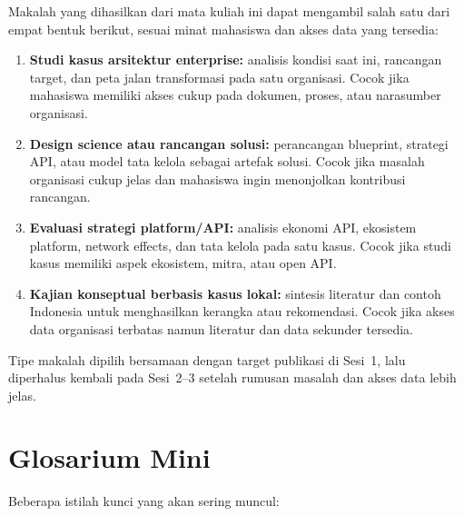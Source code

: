 Makalah yang dihasilkan dari mata kuliah ini dapat mengambil salah satu dari
empat bentuk berikut, sesuai minat mahasiswa dan akses data yang tersedia:

\begin{enumerate}
  \item \textbf{Studi kasus arsitektur enterprise:} analisis kondisi saat
        ini, rancangan target, dan peta jalan transformasi pada satu
        organisasi. Cocok jika mahasiswa
        memiliki akses cukup pada dokumen, proses, atau narasumber organisasi.
  \item \textbf{Design science atau rancangan solusi:} perancangan blueprint,
        strategi API, atau model tata kelola sebagai artefak solusi. Cocok jika
        masalah organisasi cukup jelas dan mahasiswa ingin menonjolkan
        kontribusi rancangan.
  \item \textbf{Evaluasi strategi platform/API:} analisis ekonomi API,
        ekosistem platform, network effects, dan tata kelola pada satu kasus.
        Cocok jika studi kasus memiliki aspek ekosistem, mitra, atau open API.
  \item \textbf{Kajian konseptual berbasis kasus lokal:} sintesis literatur dan
        contoh Indonesia untuk menghasilkan kerangka atau rekomendasi. Cocok
        jika akses data organisasi terbatas namun literatur dan data sekunder
        tersedia.
\end{enumerate}

Tipe makalah dipilih bersamaan dengan target publikasi di Sesi~1, lalu
diperhalus kembali pada Sesi~2--3 setelah rumusan masalah dan akses data lebih
jelas.

\section{Glosarium Mini}

Beberapa istilah kunci yang akan sering muncul:

